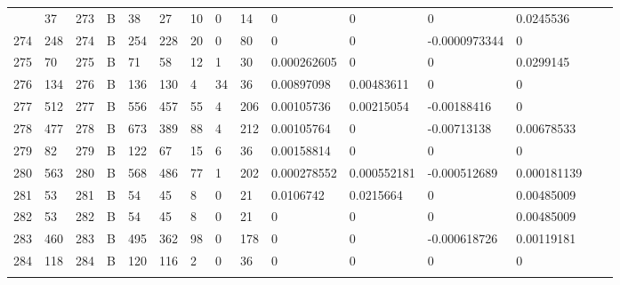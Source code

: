 \begin{longtable}{lllllllllllllll}
\begin{comment}
	273 & 37                & 273 & B   & 38                & 27                & 10                & 0    & 14         & 0              & 0              & 0             & 0.0245536    \\
	274 & 248               & 274 & B   & 254               & 228               & 20                & 0    & 80         & 0              & 0              & -0.0000973344 & 0            \\
	275 & 70                & 275 & B   & 71                & 58                & 12                & 1    & 30         & 0.000262605    & 0              & 0             & 0.0299145    \\
	276 & 134               & 276 & B   & 136               & 130               & 4                 & 34   & 36         & 0.00897098     & 0.00483611     & 0             & 0            \\
	277 & 512               & 277 & B   & 556               & 457               & 55                & 4    & 206        & 0.00105736     & 0.00215054     & -0.00188416   & 0            \\
	278 & 477               & 278 & B   & 673               & 389               & 88                & 4    & 212        & 0.00105764     & 0              & -0.00713138   & 0.00678533   \\
	279 & 82                & 279 & B   & 122               & 67                & 15                & 6    & 36         & 0.00158814     & 0              & 0             & 0            \\
	280 & 563               & 280 & B   & 568               & 486               & 77                & 1    & 202        & 0.000278552    & 0.000552181    & -0.000512689  & 0.000181139  \\
	281 & 53                & 281 & B   & 54                & 45                & 8                 & 0    & 21         & 0.0106742      & 0.0215664      & 0             & 0.00485009   \\
	282 & 53                & 282 & B   & 54                & 45                & 8                 & 0    & 21         & 0              & 0              & 0             & 0.00485009   \\
	283 & 460               & 283 & B   & 495               & 362               & 98                & 0    & 178        & 0              & 0              & -0.000618726  & 0.00119181   \\
	284 & 118               & 284 & B   & 120               & 116               & 2                 & 0    & 36         & 0              & 0              & 0             & 0            \\

\end{comment}
\end{longtable}
